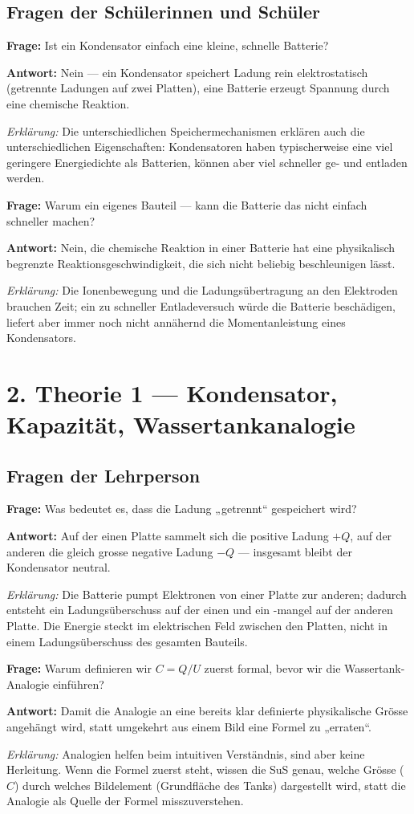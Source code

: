 \documentclass[11pt,a4paper]{article}
\newcommand{\Frage}[1]{\textbf{Frage:} #1\par}
\newcommand{\Antwort}[1]{\textbf{Antwort:} #1\par}
\newcommand{\Erklaerung}[1]{\textit{Erklärung:} #1}
\newcommand{\FrageBlock}[3]{\Frage{#1}\Antwort{#2}\Erklaerung{#3}\vspace{0.6em}}
\begin{document}
\subsection*{Fragen der Schülerinnen und Schüler}

\FrageBlock{Ist ein Kondensator einfach eine kleine, schnelle Batterie?}
{Nein --- ein Kondensator speichert Ladung rein elektrostatisch (getrennte Ladungen auf zwei Platten), eine Batterie erzeugt Spannung durch eine chemische Reaktion.}
{Die unterschiedlichen Speichermechanismen erklären auch die unterschiedlichen Eigenschaften: Kondensatoren haben typischerweise eine viel geringere Energiedichte als Batterien, können aber viel schneller ge- und entladen werden.}

\FrageBlock{Warum ein eigenes Bauteil --- kann die Batterie das nicht einfach schneller machen?}
{Nein, die chemische Reaktion in einer Batterie hat eine physikalisch begrenzte Reaktionsgeschwindigkeit, die sich nicht beliebig beschleunigen lässt.}
{Die Ionenbewegung und die Ladungsübertragung an den Elektroden brauchen Zeit; ein zu schneller Entladeversuch würde die Batterie beschädigen, liefert aber immer noch nicht annähernd die Momentanleistung eines Kondensators.}

\section*{2. Theorie 1 --- Kondensator, Kapazität, Wassertankanalogie}

\subsection*{Fragen der Lehrperson}

\FrageBlock{Was bedeutet es, dass die Ladung „getrennt“ gespeichert wird?}
{Auf der einen Platte sammelt sich die positive Ladung $+Q$, auf der anderen die gleich grosse negative Ladung $-Q$ --- insgesamt bleibt der Kondensator neutral.}
{Die Batterie pumpt Elektronen von einer Platte zur anderen; dadurch entsteht ein Ladungsüberschuss auf der einen und ein -mangel auf der anderen Platte. Die Energie steckt im elektrischen Feld zwischen den Platten, nicht in einem Ladungsüberschuss des gesamten Bauteils.}

\FrageBlock{Warum definieren wir $C=Q/U$ zuerst formal, bevor wir die Wassertank-Analogie einführen?}
{Damit die Analogie an eine bereits klar definierte physikalische Grösse angehängt wird, statt umgekehrt aus einem Bild eine Formel zu „erraten“.}
{Analogien helfen beim intuitiven Verständnis, sind aber keine Herleitung. Wenn die Formel zuerst steht, wissen die SuS genau, welche Grösse ($C$) durch welches Bildelement (Grundfläche des Tanks) dargestellt wird, statt die Analogie als Quelle der Formel misszuverstehen.}
\end{document}
